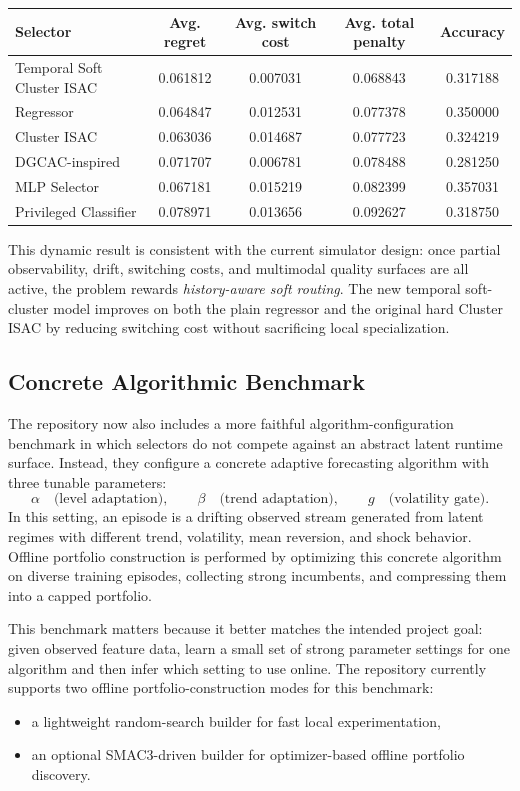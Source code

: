 \documentclass[11pt]{report}
\begin{document}
\begin{center}
\begin{tabular}{lcccc}
\toprule
Selector & Avg. regret & Avg. switch cost & Avg. total penalty & Accuracy \\
\midrule
Temporal Soft Cluster ISAC & 0.061812 & 0.007031 & 0.068843 & 0.317188 \\
Regressor & 0.064847 & 0.012531 & 0.077378 & 0.350000 \\
Cluster ISAC & 0.063036 & 0.014687 & 0.077723 & 0.324219 \\
DGCAC-inspired & 0.071707 & 0.006781 & 0.078488 & 0.281250 \\
MLP Selector & 0.067181 & 0.015219 & 0.082399 & 0.357031 \\
Privileged Classifier & 0.078971 & 0.013656 & 0.092627 & 0.318750 \\
\bottomrule
\end{tabular}
\end{center}

This dynamic result is consistent with the current simulator design: once partial observability, drift, switching costs, and multimodal quality surfaces are all active, the problem rewards \emph{history-aware soft routing}. The new temporal soft-cluster model improves on both the plain regressor and the original hard Cluster ISAC by reducing switching cost without sacrificing local specialization.

\subsection{Concrete Algorithmic Benchmark}

The repository now also includes a more faithful algorithm-configuration benchmark in which selectors do not compete against an abstract latent runtime surface. Instead, they configure a concrete adaptive forecasting algorithm with three tunable parameters:
\[
\alpha \quad \text{(level adaptation)}, \qquad
\beta \quad \text{(trend adaptation)}, \qquad
g \quad \text{(volatility gate)}.
\]
In this setting, an episode is a drifting observed stream generated from latent regimes with different trend, volatility, mean reversion, and shock behavior. Offline portfolio construction is performed by optimizing this concrete algorithm on diverse training episodes, collecting strong incumbents, and compressing them into a capped portfolio.

This benchmark matters because it better matches the intended project goal: given observed feature data, learn a small set of strong parameter settings for one algorithm and then infer which setting to use online. The repository currently supports two offline portfolio-construction modes for this benchmark:
\begin{itemize}[leftmargin=2em]
\item a lightweight random-search builder for fast local experimentation,
\item an optional SMAC3-driven builder for optimizer-based offline portfolio discovery.
\end{itemize}
\end{document}
